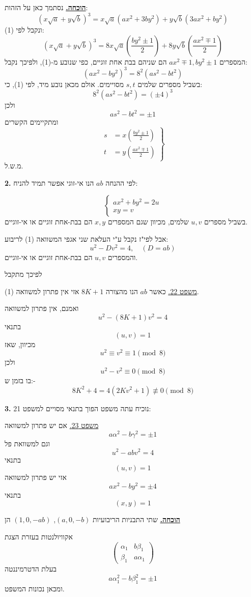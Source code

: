 \medskip
\noindent\textbf{\underline{הוכחה.}}
נסתמך כאן על הזהות:
\[ (x\sqrt{a} + y\sqrt{b})^3 = x\sqrt{a}(ax^2+3by^2) + y\sqrt{b}(3ax^2+by^2) \]
ונקבל לפי (1):
\[ (x\sqrt{a} + y\sqrt{b})^3 = 8x\sqrt{a}\left(\frac{by^2\pm1}{2}\right) + 8y\sqrt{b}\left(\frac{ax^2\mp1}{2}\right) \]
המספרים $ax^2\mp1, by^2\pm1$ הם שניהם בבת אחת זוגיים, כפי שנובע מ-(1), ולפיכך נקבל:
\[ (ax^2 - by^2)^3 = 8^2(as^2 - bt^2) \tag{3} \]
בשביל מספרים שלמים $s,t$ מסויימים. אולם מכאן נובע מיד, לפי (1), כי:
\[ 8^2(as^2 - bt^2) = (\pm4)^3 \]
ולכן
\[ as^2 - bt^2 = \pm 1 \tag{4} \]
ומתקיימים הקשרים
\[ \left. \begin{aligned} s &= x\left(\frac{by^2\pm1}{2}\right) \\ t &= y\left(\frac{ax^2\mp1}{2}\right) \end{aligned} \right\} \tag{5} \]
\hfill מ.ש.ל.

\medskip
\noindent\textbf{2.} לפי ההנחה $ab$ הנו אי-זוגי אפשר תמיד להניח:

\[ \begin{cases} ax^2 + by^2 = 2u \\ xy = v \end{cases} \tag{6} \]
בשביל מספרים $u,v$ שלמים, מכיוון שגם המספרים $x,y$ הם בבת-אחת זוגיים או אי-זוגיים.

\noindent אבל לפי"ז נקבל ע"י העלאת שני אגפי המשוואה (1) לריבוע:
\[ u^2 - Dv^2 = 4 , \quad (D=ab) \tag{7} \]
והמספרים $u,v$ הם בבת-אחת זוגיים או אי-זוגיים.

\noindent לפיכך מתקבל

\medskip
\noindent\underline{משפט 22.} כאשר $ab$ הנו מהצורה $8K+1$ אזי אין פתרון למשוואה (1).

\noindent ואמנם, אין פתרון למשוואה
\[ u^2 - (8K+1)v^2 = 4 \]
בתנאי
\[ (u,v) = 1 \]
מכיוון, שאז
\[ u^2 \equiv v^2 \equiv 1 \pmod{8} \]
ולכן
\[ u^2 - v^2 \equiv 0 \pmod{8} \]
בו בזמן ש:-
\[ 8K^2 + 4 = 4(2Kv^2+1) \not\equiv 0 \pmod{8} \]

\medskip
\noindent\textbf{3.} נוכיח עתה משפט הפוך בתנאי מסויים למשפט 21:

\medskip
\noindent\underline{משפט 23.} אם יש פתרון למשוואה
\[ a\alpha^2 - b\gamma^2 = \pm 1 \]
וגם למשוואת פל
\[ u^2 - abv^2 = 4 \]
בתנאי
\[ (u,v) = 1 \]
אזי יש פתרון למשוואה
\[ ax^2 - by^2 = \pm 4 \]
בתנאי
\[ (x,y) = 1 \]

\medskip
\noindent\textbf{\underline{הוכחה.}}
שתי התבניות הריבועיות $(a,0,-b)$, $(1,0,-ab)$ הן

\noindent אקוויולנטות בעזרת הצגת
\[ \begin{pmatrix} \alpha_1 & b\beta_1 \\ \beta_1 & a\alpha_1 \end{pmatrix} \]
בעלת הדטרמיננטה
\[ a\alpha_1^2 - b\beta_1^2 = \pm 1 \]
ומכאן נכונות המשפט.

